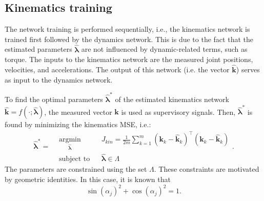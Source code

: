\subsection{Kinematics training}
The network training is performed sequentially, i.e., the kinematics network is trained first followed by the dynamics network. This is due to the fact that the estimated parameters $\hat{\bm{\lambda}}$ are not influenced by dynamic-related terms, such as torque. The inputs to the kinematics network are the measured joint positions, velocities, and accelerations. The output of this network (i.e. the vector $\hat{\bm{k}}$) serves as input to the dynamics network. 

To find the optimal parameters $\hat{\bm{\lambda}}^*$ of the estimated kinematics network $\hat{\bm{k}}=f(\cdot;\hat{\bm{\lambda}})$, the measured vector $\bm{k}$ is used as supervisory signals. Then, $\hat{\bm{\lambda}}^*$ is found by minimizing the kinematics MSE, i.e.: 
\begin{equation}
\hat{\bm{\lambda}}^* = \begin{aligned}
& \underset{\hat{\bm{\lambda}}}{\text{argmin}}
& & J_{kin}=\frac{1}{2m}\sum_{k=1}^{m} (\bm{k}_k-\hat{\bm{k}}_k)^\intercal(\bm{k}_k-\hat{\bm{k}}_k) \\
& \text{subject to}
& & \hat{\bm{\lambda}} \in \Lambda
\end{aligned}.
\label{eq:kin_cost_func}
\end{equation}
The parameters are constrained using the set $\Lambda$. These constraints are motivated by geometric identities. In this case, it is known that
\begin{equation}
\sin(\alpha_j)^2+\cos(\alpha_j)^2 =1.
\end{equation}
